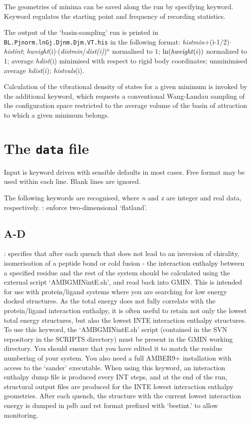 The geometries of minima can be saved along the run by specifying { } keyword. Keyword {}
regulates the starting point and frequency of recording statistics.

The output of the `basin-sampling' run is printed in {\tt BL.Pjnorm.lnGj.Djnm.Djm.VT.his} in the
following format: 
{\it histmin}+(i-1/2)$\cdot${\it histint}; {\it hweight}(i)$\cdot$({\it distmin}/{\it dist(i)})$^\kappa$ 
normalised to $1$; ${\it \ln(hweight}(i))$ normalized to $1$;
average {\it hdist}(i) minimised with respect to rigid body coordinates; unminimised average 
{\it hdist}(i); {\it histvals}(i). 

Calculation of the
vibrational density of states for a given minimum is invoked by 
the additional {} keyword, which
requests a conventional Wang-Landau sampling of the configuration 
space restricted to the average volume of the basin of
attraction to which a given minimum belongs.\cite{BogdanWC06}

\section{The {\tt data} file}

Input is keyword driven with sensible defaults in most cases. 
Free format may be used within each line. Blank lines are ignored.

The following keywords are recognised, where {\it n\/} and {\it x\/} are integer and
real data, respectively.
\smallskip
{}: enforce two-dimensional `flatland'.


\subsection{A-D}

: specifies that after each quench that does not lead to an inversion of chirality, 
isomerisation of a peptide bond or cold fusion - the interaction enthalpy between a specified residue and the rest of the system
should be calculated using the external script `AMBGMINintE.sh', and read back into GMIN. This is intended for
use with protein/ligand systems where you are searching for low energy docked structures. As the total energy
does not fully correlate with the protein/ligand interaction enthalpy, it is often useful to retain not only the
lowest {\/} total energy structures, but also the lowest {INTE\/} interaction enthalpy structures.
To use this keyword, the `AMBGMINintE.sh' script (contained in the SVN repository in the SCRIPTS directory) must
be present in the GMIN working directory. You should ensure that you have edited it to match the residue numbering
of your system. You also need a full AMBER9+ installation with access to the `sander' executable. When using this
keyword, an interaction enthalpy dump file is produced every {INT\/} steps, and at the end of the run, 
structural output files are produced for the {INTE\/} lowest interaction enthalpy geometries. After each quench, 
the structure with the current lowest interaction energy is dumped in pdb and rst format prefixed with `bestint.' to allow
monitoring.

